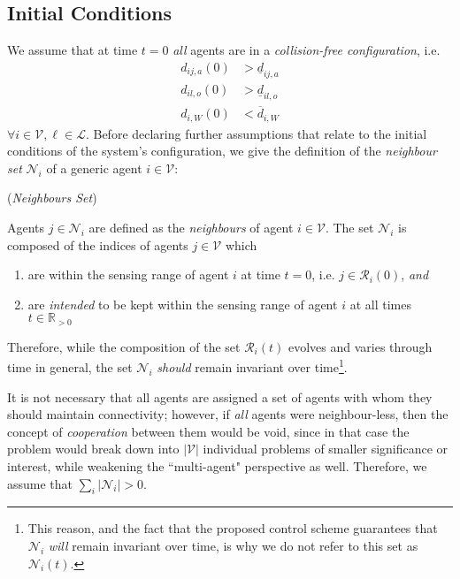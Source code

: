 \subsection{Initial Conditions}

We assume that at time $t=0$ \textit{all} agents are in a
\textit{collision-free configuration}, i.e.
\begin{subequations}
\begin{align}
    d_{ij,a}(0) &> \underline{d}_{ij,a} \\[2.5ex]
    d_{il,o}(0) &> \underline{d}_{il,o} \\[2.5ex]
    d_{i,W}(0)  &< \overline{d}_{i,W}
\label{eq:initially_coll_free}
\end{align}
\end{subequations}
$\forall i \in \mathcal{V}, \ell \in \mathcal{L}$. Before declaring further
assumptions that relate to the initial conditions of the system's configuration,
we give the definition of the \textit{neighbour set} $\mathcal{N}_i$ of a
generic agent $i \in \mathcal{V}$:
\begin{bw_box}
\begin{definition} (\textit{Neighbours Set})

Agents $j \in \mathcal{N}_i$ are defined as the \textit{neighbours} of
agent $i \in \mathcal{V}$. The set $\mathcal{N}_i$ is composed of the
indices of agents $j \in \mathcal{V}$ which
\begin{enumerate}
  \item are within the sensing range of agent $i$ at time $t=0$, i.e.
    $j \in \mathcal{R}_i(0)$, \textit{and}
  \item are \textit{intended} to be kept within the sensing range of agent $i$ at all
    times $t \in \mathbb{R}_{> 0}$
\end{enumerate}
\end{definition}
\end{bw_box}

Therefore, while the composition of the set $\mathcal{R}_i(t)$ evolves and
varies through time in general, the set $\mathcal{N}_i$ \textit{should} remain
invariant over time\footnote{This reason, and the fact that the proposed
control scheme guarantees that $\mathcal{N}_i$ \textit{will} remain invariant
over time, is why we do not refer to this set as $\mathcal{N}_i(t)$.}.

It is not necessary that all agents are assigned a set of agents with whom they
should maintain connectivity; however, if \textit{all} agents were
neighbour-less, then the concept of \textit{cooperation} between them would be
void, since in that case the problem would break down into $|\mathcal{V}|$
individual problems of smaller significance or interest, while weakening the
``multi-agent" perspective as well. Therefore, we assume that
$\sum\limits_i |\mathcal{N}_i| > 0$.

